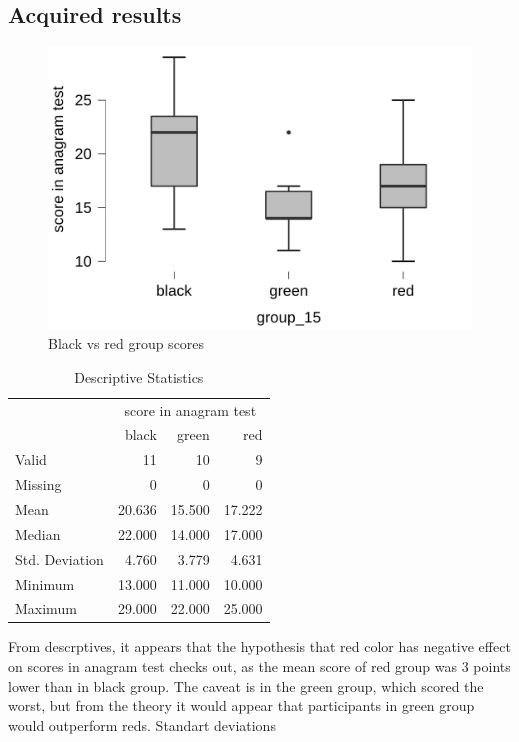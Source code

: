 \documentclass[12pt, a4]{article}
\begin{document}
\subsection*{Acquired results}
\begin{figure}[H]
    \centering
    \caption{Black vs red group scores}
    \label{fig:graph1}
    \includegraphics{general}
\end{figure}
\begin{table}[H]
	\centering
	\caption{Descriptive Statistics}
	\label{tab:descriptiveStatistics}
	{
		\begin{tabular}{lrrr}
			\toprule
			\multicolumn{1}{c}{} & \multicolumn{3}{c}{score in anagram test} \\
			\cline{2-4}
			 & black & green & red  \\
			\cmidrule[0.4pt]{1-4}
			Valid & 11 & 10 & 9  \\
			Missing & 0 & 0 & 0  \\
			Mean & 20.636 & 15.500 & 17.222  \\
			Median & 22.000 & 14.000 & 17.000  \\
			Std. Deviation & 4.760 & 3.779 & 4.631  \\
			Minimum & 13.000 & 11.000 & 10.000  \\
			Maximum & 29.000 & 22.000 & 25.000  \\
			\bottomrule
		\end{tabular}
	}
\end{table}
From descrptives, it appears that the hypothesis that red color has negative effect on scores in anagram test checks out, as the mean score of red group was 3 points lower than in 
black group. The caveat is in the green group, which scored the worst, but from the theory it would appear that participants in green group would outperform reds. Standart deviations 
\end{document}
